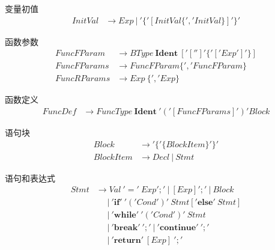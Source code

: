 变量初值
\begin{align*}
    InitVal &\longrightarrow Exp \ |\ '\{'[InitVal \{','InitVal\}]'\}'
\end{align*}

函数参数
\begin{align*}
    FuncFParam &\longrightarrow BType\ \mathbf{Ident}\ ['['']'\{'['Exp']'\}] \\
    FuncFParams &\longrightarrow FuncFParam \{','FuncFParam\}\\
    FuncRParams &\longrightarrow Exp\ \{','Exp\}
\end{align*}

函数定义
\begin{align*}
    FuncDef &\longrightarrow FuncType\ \mathbf{Ident}\ '('[FuncFParams]')' Block
\end{align*}

语句块
\begin{align*}
    Block &\longrightarrow '\{'\{BlockItem\}'\}' \\
    BlockItem &\longrightarrow Decl\ |\ Stmt
\end{align*}

语句和表达式
\begin{align*}
    Stmt &\longrightarrow Val\ '='\ Exp';'\ |\ [Exp]';'\ |\ Block \\
    &\ \ \ \ \ \ |\ \mathbf{'if'}\ '('Cond')'\ Stmt[\mathbf{'else'}\ Stmt] \\
    &\ \ \ \ \ \ |\ \mathbf{'while'}\ '('Cond')'\ Stmt \\
    &\ \ \ \ \ \ |\ \mathbf{'break'}\ ';'\ |\ \mathbf{'continue'}\ ';' \\
    &\ \ \ \ \ \ |\ \mathbf{'return'}\ [Exp]\ ';'
\end{align*}


